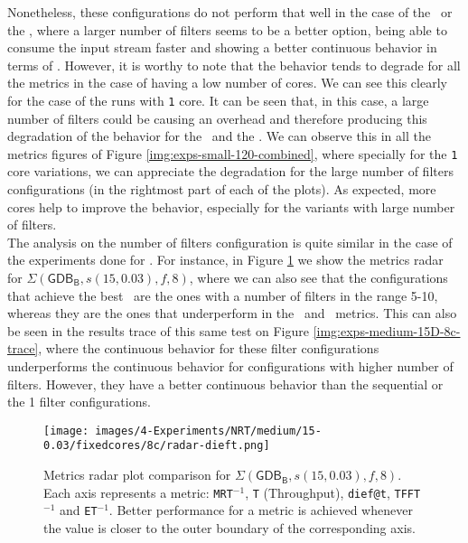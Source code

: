 Nonetheless, these configurations do not perform that well in the case of the \ET\ or the \dieft, where a larger number of filters seems to be a better option, being able to consume the input stream faster and showing a better continuous behavior in terms of \dieft. However, it is worthy to note that the behavior tends to degrade for all the metrics in the case of having a low number of cores. We can see this clearly for the case of the runs with \texttt{1} core. It can be seen that, in this case, a large number of filters could be causing an overhead and therefore producing this degradation of the behavior for the \ET\ and the \dieft. We can observe this in all the metrics figures of Figure \ref{img:exps-small-120-combined}, where specially for the \texttt{1} core variations, we can appreciate the degradation for the large number of filters configurations (in the rightmost part of each of the plots). As expected, more cores help to improve the behavior, especially for the variants with large number of filters.\\

The analysis on the number of filters configuration is quite similar in the case of the experiments done for \mediumG. For instance, in Figure \ref{img:exps-medium-15D-8c-radar-dieft} we show the metrics radar for $\Sigma(\mathsf{GDB_B}, s(15, 0.03), f, 8)$, where we can also see that the configurations that achieve the best \MRT\ are the ones with a number of filters in the range 5-10, whereas they are the ones that underperform in the \ET\ and \dieft\ metrics. This can also be seen in the results trace of this same test on Figure \ref{img:exps-medium-15D-8c-trace}, where the continuous behavior for these filter configurations underperforms the continuous behavior for configurations with higher number of filters. However, they have a better continuous behavior than the sequential or the 1 filter configurations.\\

\begin{figure}[H]
    \centering
    \texttt{[image: images/4-Experiments/NRT/medium/15-0.03/fixedcores/8c/radar-dieft.png]}
    \caption{Metrics radar plot comparison for $\Sigma(\mathsf{GDB_B}, s(15, 0.03), f, 8)$. Each axis represents a metric: \texttt{MRT$^{-1}$}, \texttt{T} (Throughput), \texttt{dief@t}, \texttt{TFFT$^{-1}$} and \texttt{ET$^{-1}$}. Better performance for a metric is achieved whenever the value is closer to the outer boundary of the corresponding axis.}
    \label{img:exps-medium-15D-8c-radar-dieft}
\end{figure}

